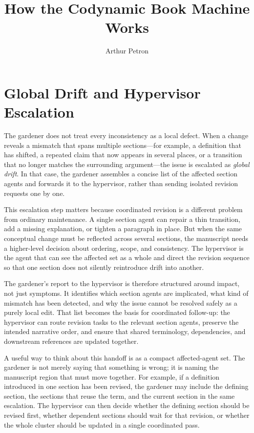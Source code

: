 \documentclass[11pt]{article}
\title{How the Codynamic Book Machine Works}
\author{Arthur Petron}
\begin{document}
\section*{Global Drift and Hypervisor Escalation}

The gardener does not treat every inconsistency as a local defect. When a change reveals a mismatch that spans multiple sections---for example, a definition that has shifted, a repeated claim that now appears in several places, or a transition that no longer matches the surrounding argument---the issue is escalated as \emph{global drift}. In that case, the gardener assembles a concise list of the affected section agents and forwards it to the hypervisor, rather than sending isolated revision requests one by one.

This escalation step matters because coordinated revision is a different problem from ordinary maintenance. A single section agent can repair a thin transition, add a missing explanation, or tighten a paragraph in place. But when the same conceptual change must be reflected across several sections, the manuscript needs a higher-level decision about ordering, scope, and consistency. The hypervisor is the agent that can see the affected set as a whole and direct the revision sequence so that one section does not silently reintroduce drift into another.

The gardener's report to the hypervisor is therefore structured around impact, not just symptoms. It identifies which section agents are implicated, what kind of mismatch has been detected, and why the issue cannot be resolved safely as a purely local edit. That list becomes the basis for coordinated follow-up: the hypervisor can route revision tasks to the relevant section agents, preserve the intended narrative order, and ensure that shared terminology, dependencies, and downstream references are updated together.

A useful way to think about this handoff is as a compact affected-agent set. The gardener is not merely saying that something is wrong; it is naming the manuscript region that must move together. For example, if a definition introduced in one section has been revised, the gardener may include the defining section, the sections that reuse the term, and the current section in the same escalation. The hypervisor can then decide whether the defining section should be revised first, whether dependent sections should wait for that revision, or whether the whole cluster should be updated in a single coordinated pass.
\end{document}
